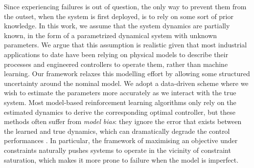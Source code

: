 \documentclass{article}
\begin{document}
Since experiencing failures is out of question, the only way to prevent them from the outset, when the system is first deployed, is to rely on some sort of prior knowledge. In this work, we assume that the system dynamics are partially known, in the form of a parametrized dynamical system with unknown parameters. We argue that this assumption is realistic given that most industrial applications to date have been relying on physical models to describe their processes and engineered controllers to operate them, rather than machine learning. Our framework relaxes this modelling effort by allowing some structured uncertainty around the nominal model. We adopt a data-driven scheme where we wish to estimate the parameters more accurately as we interact with the true system. Most model-based reinforcement learning algorithms only rely on the estimated dynamics to derive the corresponding optimal controller, but these methods often suffer from \emph{model bias}: they ignore the error that exists between the learned and true dynamics, which can dramatically degrade the control performances \citep{Schneider1997}. In particular, the framework of maximising an objective under constraints naturally pushes systems to operate in the vicinity of constraint saturation, which makes it more prone to failure when the model is imperfect.
\end{document}
